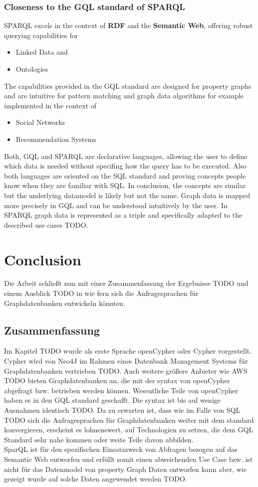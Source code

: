 \subsection{Closeness to the GQL standard of SPARQL}
SPARQL excels in the context of \textbf{RDF} and the \textbf{Semantic Web}, offering robust querying capabilities for 
\begin{itemize}
	\item Linked Data and 
	\item Ontologies
\end{itemize}
The capabilities provided in the GQL standard are designed for property graphs and are 
intuitive for pattern matching and graph data algorithms for example implemented in the context of 
\begin{itemize}
	\item Social Networks
	\item Recommendation Systems
\end{itemize}
Both, GQL and SPARQL are declarative languages, allowing the user to define which data is needed
without specifing how the query has to be executed. Also both languages are oriented on the SQL standard
and proving concepts people know when they are familiar with SQL.
In conclusion, the concepts are similar but the underlying datamodel is likely but not the same.
Graph data is mapped more precisely in GQL and can be understood intuitively by the user.\newline
In SPARQL graph data is represented as a triple and specifically adapted 
to the described use cases TODO.

\chapter{Conclusion}
Die Arbeit schließt nun mit einer Zusammenfassung der Ergebnisse TODO und einem Ausblick TODO 
in wie fern sich die Anfragesprachen für Graphdatenbanken entwickeln könnten.

\section{Zusammenfassung}
Im Kapitel TODO wurde als erste Sprache openCypher oder Cypher vorgestellt. 
Cypher wird von Neo4J im Rahmen eines Datenbank Management Systems für Graphdatenbanken 
vertrieben TODO. Auch weitere größere Anbieter wie AWS TODO bieten Graphdatenbanken an, die 
mit der syntax von openCypher abgefragt bzw. betrieben werden können.
Wesentliche Teile von openCypher haben es in den GQL standard geschafft. Die syntax ist 
bis auf wenige Ausnahmen identisch TODO. Da zu erwarten ist, dass wie im Falle von SQL TODO
sich die Anfragesprachen für Graphdatenbanken weiter mit dem standard konvergieren, 
erscheint es lohnenswert, auf Technologien zu setzen, die dem GQL Standard sehr nahe kommen 
oder weite Teile davon abbilden. \\
SparQL ist für den spezifischen Einsatzzweck von Abfragen bezogen auf das Semantic Web 
entworfen und erfüllt somit einen abweichenden Use Case bzw. ist nicht für das Datenmodel
von property Graph Daten entworfen kann aber, wie gezeigt wurde auf solche Daten angewendet werden 
TODO.
